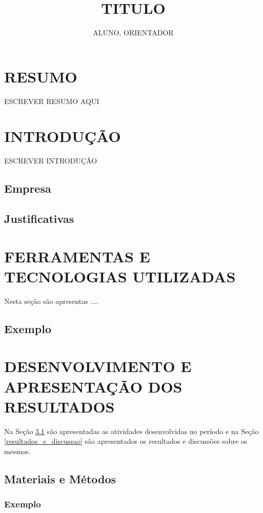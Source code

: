 \documentclass[12pt]{article}
\title{TITULO} %
\author{ALUNO\inst{1}, ORIENTADOR\inst{1} } %
\begin{document}
\thispagestyle{empty} %
\tableofcontents %
 
\clearpage %
\setcounter{page}{4} %

\section*{RESUMO}
\thispagestyle{empty}
ESCREVER RESUMO AQUI

\clearpage

\section{INTRODUÇÃO}
ESCREVER INTRODUÇÃO

\subsection{Empresa}
\lipsum[2-4]

\subsection{Justificativas}

\section{FERRAMENTAS E TECNOLOGIAS UTILIZADAS}

    Nesta seção são apresentas ....

    \subsection{Exemplo}

\section{DESENVOLVIMENTO E APRESENTAÇÃO DOS RESULTADOS}
    Na Seção \ref{materiais_e_metodos} são apresentadas as atividades desenvolvidas no período e na Seção \ref{resultados_e_discussao} são apresentados os resultados e discussões sobre os mesmos.

\subsection{Materiais e Métodos}
\label{materiais_e_metodos}
    
    \subsubsection{Exemplo}
\end{document}
